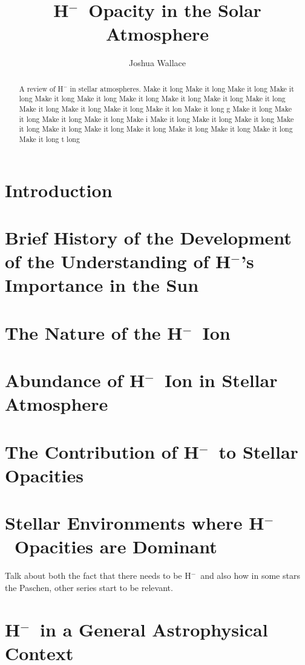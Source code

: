 \documentclass{emulateapj}
\def\h{H$^-$}
\begin{document}
\title{\h\ Opacity in the Solar Atmosphere}

\author{Joshua Wallace}


\begin{abstract}
A review of H$^-$ in stellar atmospheres. Make it long  Make it long  Make it long  Make it long  Make it long  Make it long  Make it long  Make it long  Make it long  Make it long  Make it long  Make it long  Make it long  Make it lon Make it long g  Make it long  Make it long  Make it long  Make it long  Make i Make it long  Make it long  Make it long  Make it long  Make it long  Make it long  Make it long  Make it long  Make it long  Make it long  Make it long t long 
\end{abstract}


\section{Introduction}


\section{Brief History of the Development of the Understanding of \h's Importance in the Sun}


\section{The Nature of the \h\ Ion}


\section{Abundance of \h\ Ion in Stellar Atmosphere}


\section{The Contribution of \h\ to Stellar Opacities}


\section{Stellar Environments where \h\ Opacities are Dominant}
Talk about both the fact that there needs to be \h\ and also how in
some stars the Paschen, other series start to be relevant.

\section{\h\ in a General Astrophysical Context}





\end{document}
